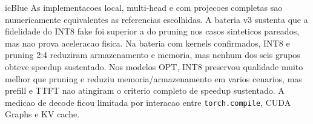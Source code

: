 \begin{icstatus}{icBlue}
As implementacoes local, multi-head e com projecoes completas sao numericamente
equivalentes as referencias escolhidas. A bateria v3 sustenta que a fidelidade
do INT8 fake foi superior a do pruning nos casos sinteticos pareados, mas nao
prova aceleracao fisica. Na bateria com kernels confirmados, INT8 e pruning 2:4
reduziram armazenamento e memoria, mas nenhum dos seis grupos obteve speedup
sustentado. Nos modelos OPT, INT8 preservou qualidade muito melhor que pruning
e reduziu memoria/armazenamento em varios cenarios, mas prefill e TTFT nao
atingiram o criterio completo de speedup sustentado. A medicao de decode ficou
limitada por interacao entre \texttt{torch.compile}, CUDA Graphs e KV cache.
\end{icstatus}
